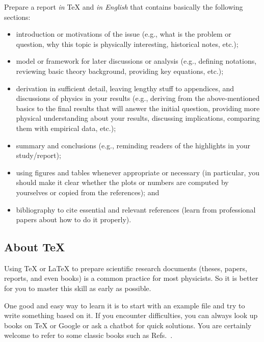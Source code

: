 \documentclass[aps,prd,preprint,floats,epsf,superscriptaddress,nofootinbib]{revtex4}
\begin{document}
Prepare a report {\it in} {\TeX} and {\it in English} that contains basically the following sections:
\begin{itemize}
\item
introduction or motivations of the issue (e.g., what is the problem or question, why this topic is physically interesting, historical notes, etc.);

\item
model or framework for later discussions or analysis (e.g., defining notations, reviewing basic theory background, providing key equations, etc.);

\item
derivation in sufficient detail, leaving lengthy stuff to appendices, and discussions of physics in your results (e.g., deriving from the above-mentioned basics to the final results that will answer the initial question, providing more physical understanding about your results, discussing implications, comparing them with empirical data, etc.);

\item
summary and conclusions (e.g., reminding readers of the highlights in your study/report);

\item
using figures and tables whenever appropriate or necessary (in particular, you should make it clear whether the plots or numbers are computed by yourselves or copied from the references); and

\item
bibliography to cite essential and relevant references (learn from professional papers about how to do it properly).
\end{itemize}


\subsection{About {\TeX}}
\label{sec:About TeX}


Using {\TeX} or {\LaTeX} to prepare scientific research documents (theses, papers, reports, and even books) is a common practice for most physicists.  So it is better for you to master this skill as early as possible.


One good and easy way to learn it is to start with an example file and try to write something based on it.  If you encounter difficulties, you can always look up books on {\TeX} or Google or ask a chatbot for quick solutions.  You are certainly welcome to refer to some classic books such as Refs.~\cite{knuth1986texbook,lamport1994latex}.
\end{document}
